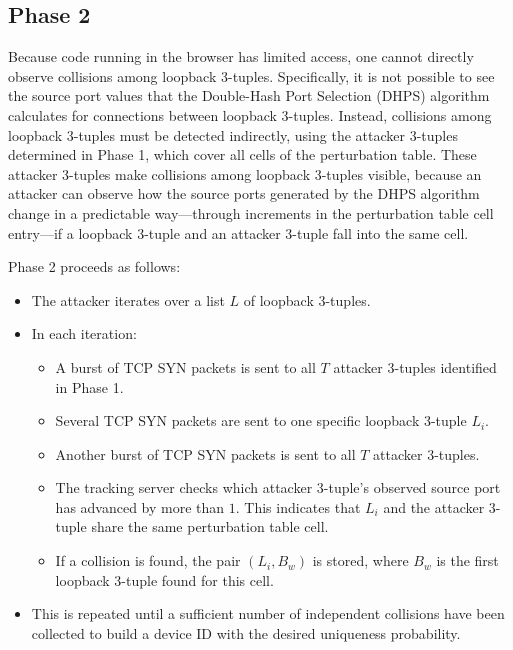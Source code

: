 \documentclass{report}
\begin{document}
\begin{center}
    \begin{minipage}[t]{0.5\textwidth}
      \vspace{0cm}
      
      
    \end{minipage}
\end{center}


\subsection{Phase 2}
\label{sec:phase 2}

Because code running in the browser has limited access, one cannot directly observe collisions among loopback 3-tuples. Specifically, it is not possible to see the source port values that the Double-Hash Port Selection (DHPS) algorithm calculates for connections between loopback 3-tuples. Instead, collisions among loopback 3-tuples must be detected indirectly, using the attacker 3-tuples determined in Phase 1, which cover all cells of the perturbation table. These attacker 3-tuples make collisions among loopback 3-tuples visible, because an attacker can observe how the source ports generated by the DHPS algorithm change in a predictable way—through increments in the perturbation table cell entry—if a loopback 3-tuple and an attacker 3-tuple fall into the same cell.

Phase 2 proceeds as follows:

\begin{itemize}
    \item The attacker iterates over a list $L$ of loopback 3-tuples.
    \item In each iteration:
    \begin{itemize}
        \item A burst of TCP SYN packets is sent to all $T$ attacker 3-tuples identified in Phase 1.
        \item Several TCP SYN packets are sent to one specific loopback 3-tuple $L_i$.
        \item Another burst of TCP SYN packets is sent to all $T$ attacker 3-tuples.
        \item The tracking server checks which attacker 3-tuple’s observed source port has advanced by more than $1$. This indicates that $L_i$ and the attacker 3-tuple share the same perturbation table cell.
        \item If a collision is found, the pair $(L_i, B_w)$ is stored, where $B_w$ is the first loopback 3-tuple found for this cell.
    \end{itemize}
    \item This is repeated until a sufficient number of independent collisions have been collected to build a device ID with the desired uniqueness probability.
\end{itemize}
\end{document}
